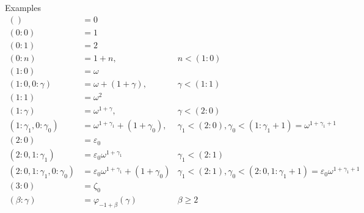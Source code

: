 \documentclass{article}
\newcommand{\w}{\omega}
\newcommand{\e}{\varepsilon}
\begin{document}


Examples \\
\begin{align*}
  () &= 0 \\
  (0:0) &= 1 \\
  (0:1) &= 2 \\
  (0:n) &= 1+n, & n < (1: 0) \\
  (1:0) &= \w \\
  (1:0, 0:\gamma) &= \w+(1+\gamma), & \gamma < (1: 1) \\
  (1:1) &= \w^2 \\
  (1:\gamma) &= \w^{1+\gamma}, & \gamma < (2: 0) \\
  (1:\gamma_1, 0:\gamma_0) &= \w^{1+\gamma_1}+(1+\gamma_0),
  & \gamma_1 < (2: 0), \gamma_0 < (1:\gamma_1+1) = \w^{1+\gamma_1+1} \\
  (2:0) &= \e_0 \\
  (2:0, 1: \gamma_1) &= \e_0\w^{1+\gamma_1}
  & \gamma_1 < (2: 1) \\
  (2:0, 1:\gamma_1, 0:\gamma_0) &= \e_0\w^{1+\gamma_1}+(1+\gamma_0)
  & \gamma_1 < (2:1), \gamma_0 < (2:0, 1:\gamma_1+1) = \e_0\w^{1+\gamma_1+1} \\
  (3:0) &= \zeta_0 \\
  (\beta:\gamma) &= \varphi_{-1+\beta}(\gamma) & \beta \geq 2 \\
\end{align*} \\
\end{document}
